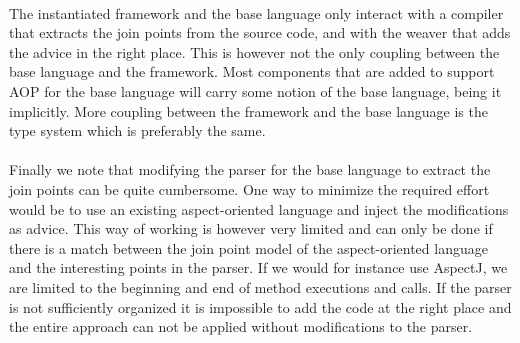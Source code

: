 \documentclass[a4paper]{report}
\begin{document}
\\
The instantiated framework and the base language only interact with a compiler that extracts the join points from the source code, and with the weaver that adds the advice in the right place. This is however not the only coupling between the base language and the framework. Most components that are added to support AOP for the base language will carry some notion of the base language, being it implicitly. More coupling between the framework and the base language is the type system which is preferably the same.\\
\\
Finally we note that modifying the parser for the base language to extract the join points can be quite cumbersome. One way to minimize the required effort would be to use an existing aspect-oriented language and inject the modifications as advice. This way of working is however very limited and can only be done if there is a match between the join point model of the aspect-oriented language and the interesting points in the parser. If we would for instance use AspectJ, we are limited to the beginning and end of method executions and calls. If the parser is not sufficiently organized it is impossible to add the code at the right place and the entire approach can not be applied without modifications to the parser.
\end{document}
